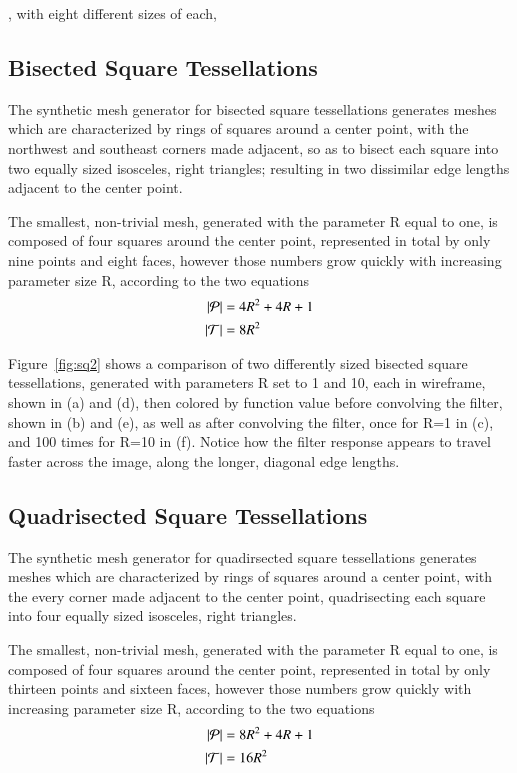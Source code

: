 , with eight different sizes of each,
%
%
%
%
\pagebreak
\subsection{Bisected Square Tessellations}
The synthetic mesh generator for bisected square tessellations generates meshes which are characterized by rings of squares around a center point, with the northwest and southeast corners made adjacent, so as to bisect each square into two equally sized isosceles, right triangles; resulting in two dissimilar edge lengths adjacent to the center point.

The smallest, non-trivial mesh, generated with the parameter R equal to one, is composed of four squares around the center point, represented in total by only nine points and eight faces, however those numbers grow quickly with increasing parameter size R, according to the two equations
\begin{align}
	|\mathcal{P}| &= 4R^2 + 4R + 1 \\
	|\mathcal{T}| &= 8R^2
	\label{eq:sq2PointAndFaceCounts}
\end{align}

Figure~\ref{fig:sq2} shows a comparison of two differently sized bisected square tessellations, generated with parameters R set to 1 and 10, each in wireframe, shown in (a) and (d), then colored by function value before convolving the filter, shown in (b) and (e), as well as after convolving the filter, once for R=1 in (c), and 100 times for R=10 in (f). Notice how the filter response appears to travel faster across the image, along the longer, diagonal edge lengths.



%
%
%
%
\pagebreak
\subsection{Quadrisected Square Tessellations}
The synthetic mesh generator for quadirsected square tessellations generates meshes which are characterized by rings of squares around a center point, with the every corner made adjacent to the center point, quadrisecting each square into four equally sized isosceles, right triangles.

The smallest, non-trivial mesh, generated with the parameter R equal to one, is composed of four squares around the center point, represented in total by only thirteen points and sixteen faces, however those numbers grow quickly with increasing parameter size R, according to the two equations
\begin{align}
	|\mathcal{P}| &= 8R^2 + 4R + 1 \\
	|\mathcal{T}| &= 16R^2
	\label{eq:sq4PointAndFaceCounts}
\end{align}

